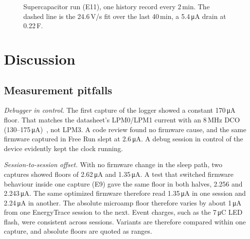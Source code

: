 \documentclass[conference]{IEEEtran}
\newcommand{\uA}{\,\si{\micro\ampere}}
\newcommand{\uC}{\,\si{\micro\coulomb}}
\begin{document}
\begin{figure}[t]
\centering
{}
\caption{Supercapacitor run (E11), one history record every 2\,min. The dashed line is the 24.6\,\textmu V/s fit over the last 40\,min, a 5.4\uA{} drain at 0.22\,F.}
\label{fig:drain}
\end{figure}

\section{Discussion}
\label{sec:discussion}

\subsection{Measurement pitfalls}

\emph{Debugger in control.} The first capture of the logger showed a constant 170\uA{} floor. That matches the datasheet's LPM0/LPM1 current with an 8\,MHz DCO (130--175\uA)~\cite{ti_slase54}, not LPM3. A code review found no firmware cause, and the same firmware captured in Free Run slept at 2.6\uA. A debug session in control of the device evidently kept the clock running.

\emph{Session-to-session offset.} With no firmware change in the sleep path, two captures showed floors of 2.62\uA{} and 1.35\uA. A test that switched firmware behaviour inside one capture (E9) gave the same floor in both halves, 2.256 and 2.243\uA. The same optimized firmware therefore read 1.35\uA{} in one session and 2.24\uA{} in another. The absolute microamp floor therefore varies by about 1\uA{} from one EnergyTrace session to the next. Event charges, such as the 7\uC{} LED flash, were consistent across sessions. Variants are therefore compared within one capture, and absolute floors are quoted as ranges.
\end{document}
